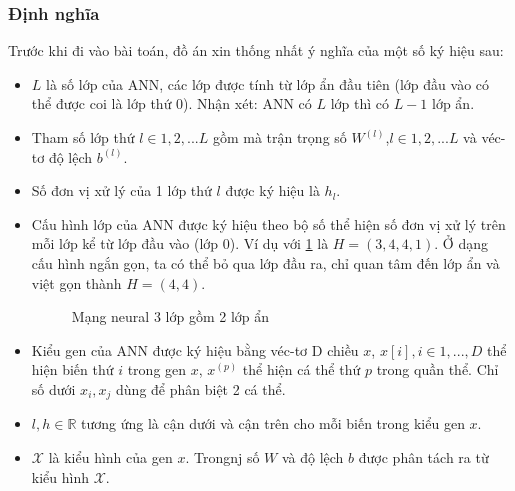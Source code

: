 \subsubsection{Định nghĩa}
Trước khi đi vào bài toán, đồ án xin thống nhất ý nghĩa của một số ký hiệu sau:
\begin{itemize}
    \item $L$ là số lớp của ANN, các lớp được tính từ lớp ẩn đầu tiên (lớp đầu vào có thể được coi là lớp thứ 0). Nhận xét: ANN có $L$ lớp thì có $L-1$ lớp ẩn.
    \item Tham số lớp thứ $l \in {1,2,...L}$ gồm mà trận trọng số $W^{(l)}$,$l\in{1,2,...L}$ và véc-tơ độ lệch $b^{(l)}$.
    \item Số đơn vị xử lý của 1 lớp thứ $l$ được ký hiệu là $h_l$.
    \item Cấu hình lớp của ANN được ký hiệu theo bộ số thể hiện số đơn vị xử lý trên mỗi lớp kể từ lớp đầu vào (lớp 0). Ví dụ với \ref{fig:ann} là $H=(3,4,4,1)$. Ở dạng cấu hình ngắn gọn, ta có thể bỏ qua lớp đầu ra, chỉ quan tâm đến lớp ẩn và việt gọn thành $H=(4,4)$.
    \begin{figure}[h!] 
        \centering
        \caption{Mạng neural 3 lớp gồm 2 lớp ẩn}
        \label{fig:ann}
    \end{figure}
    \item Kiểu gen của ANN được ký hiệu bằng véc-tơ D chiều $x$, $x[i], i\in {1,...,D}$ thể hiện biến thứ $i$ trong gen $x$, $x^{(p)}$ thể hiện cá thể thứ $p$ trong quần thể. Chỉ số dưới $x_i, x_j$ dùng để phân biệt 2 cá thể.
    \item $l,h \in \mathbb{R}$ tương ứng là cận dưới và cận trên cho mỗi biến trong kiểu gen $x$.
    \item $\mathcal{X}$ là kiểu hình của gen $x$. Trongnj số $W$ và độ lệch $b$ được phân tách ra từ kiểu hình $\mathcal{X}$. 
\end{itemize}
